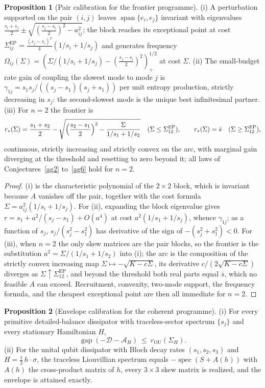 \documentclass[11pt]{article}
\theoremstyle{definition}
\newtheorem{proposition}{Proposition}
\begin{document}
\begin{proposition}[Pair calibration for the frontier programme]\label{ag:pair}
(i) A perturbation supported on the pair $(i,j)$ leaves $\operatorname{span}\{e_i,e_j\}$ invariant with eigenvalues $\tfrac{s_i+s_j}2\pm\sqrt{(\tfrac{s_j-s_i}2)^2-a_{ij}^2}$; the block reaches its exceptional point at cost $\Sigma_{ij}^{\mathrm{EP}}=\tfrac{(s_j-s_i)^2}4(1/s_i+1/s_j)$ and generates frequency $\Omega_{ij}(\Sigma)=(\Sigma/(1/s_i+1/s_j)-(\tfrac{s_j-s_i}2)^2)_+^{1/2}$ at cost $\Sigma$.  (ii) The small-budget rate gain of coupling the slowest mode to mode $j$ is $\gamma_{1j}=s_1s_j/((s_j-s_1)(s_j+s_1))$ per unit entropy production, strictly decreasing in $s_j$: the second-slowest mode is the unique best infinitesimal partner.  (iii) For $n=2$ the frontier is
\[
r_*(\Sigma)=\frac{s_1+s_2}2-\sqrt{\Bigl(\frac{s_2-s_1}2\Bigr)^2-\frac{\Sigma}{1/s_1+1/s_2}}
\quad(\Sigma\le\Sigma_{12}^{\mathrm{EP}}),\qquad r_*(\Sigma)=\bar s\quad(\Sigma\ge\Sigma_{12}^{\mathrm{EP}}),
\]
continuous, strictly increasing and strictly convex on the arc, with marginal gain diverging at the threshold and resetting to zero beyond it; all laws of Conjectures~\ref{ag2} to~\ref{ag6} hold for $n=2$.
\end{proposition}

\begin{proof}
(i) is the characteristic polynomial of the $2\times2$ block, which is invariant because $A$ vanishes off the pair, together with the cost formula $\Sigma=a_{ij}^2(1/s_i+1/s_j)$.  For (ii), expanding the block eigenvalue gives $r=s_1+a^2/(s_j-s_1)+O(a^4)$ at cost $a^2(1/s_1+1/s_j)$, whence $\gamma_{1j}$; as a function of $s_j$, $s_j/(s_j^2-s_1^2)$ has derivative of the sign of $-(s_j^2+s_1^2)<0$.  For (iii), when $n=2$ the only skew matrices are the pair blocks, so the frontier is the substitution $a^2=\Sigma/(1/s_1+1/s_2)$ into (i); the arc is the composition of the strictly convex increasing map $\Sigma\mapsto-\sqrt{K-c\Sigma}$, its derivative $c/(2\sqrt{K-c\Sigma})$ diverges as $\Sigma\uparrow\Sigma^{\mathrm{EP}}_{12}$, and beyond the threshold both real parts equal $\bar s$, which no feasible $A$ can exceed.  Recruitment, convexity, two-mode support, the frequency formula, and the cheapest exceptional point are then all immediate for $n=2$.
\end{proof}

\begin{proposition}[Envelope calibration for the coherent programme]\label{ag:env}
(i) For every primitive detailed-balance dissipator with traceless-sector spectrum $\{s_j\}$ and every stationary Hamiltonian $H$,
\[
\operatorname{gap}(-\mathcal D-\mathcal A_H)\ \le\ r_{\mathrm{OU}}(\Sigma_H).
\]
(ii) For the unital qubit dissipator with Bloch decay rates $(s_1,s_2,s_3)$ and $H=\tfrac12\,h\cdot\sigma$, the traceless Liouvillian spectrum equals $-\operatorname{spec}(S+A(h))$ with $A(h)$ the cross-product matrix of $h$, every $3\times3$ skew matrix is realized, and the envelope is attained exactly.
\end{proposition}
\end{document}
